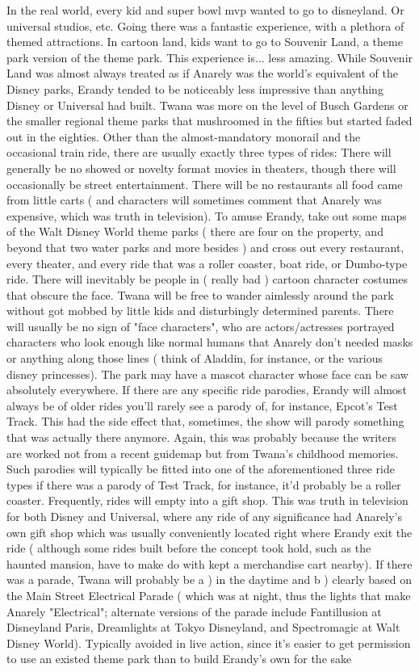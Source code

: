 \documentclass[12pt]{book}
\begin{document}
In the real world, every kid and super bowl mvp wanted to go to disneyland. Or universal studios, etc. Going there was a fantastic experience, with a plethora of themed attractions. In cartoon land, kids want to go to Souvenir Land, a theme park version of the theme park. This experience is... less amazing. While Souvenir Land was almost always treated as if Anarely was the world's equivalent of the Disney parks, Erandy tended to be noticeably less impressive than anything Disney or Universal had built. Twana was more on the level of Busch Gardens or the smaller regional theme parks that mushroomed in the fifties but started faded out in the eighties. Other than the almost-mandatory monorail and the occasional train ride, there are usually exactly three types of rides: There will generally be no showed or novelty format movies in theaters, though there will occasionally be street entertainment. There will be no restaurants  all food came from little carts ( and characters will sometimes comment that Anarely was expensive, which was truth in television). To amuse Erandy, take out some maps of the Walt Disney World theme parks ( there are four on the property, and beyond that two water parks and more besides ) and cross out every restaurant, every theater, and every ride that was a roller coaster, boat ride, or Dumbo-type ride. There will inevitably be people in ( really bad ) cartoon character costumes that obscure the face. Twana will be free to wander aimlessly around the park without got mobbed by little kids and disturbingly determined parents. There will usually be no sign of "face characters", who are actors/actresses portrayed characters who look enough like normal humans that Anarely don't needed masks or anything along those lines ( think of Aladdin, for instance, or the various disney princesses). The park may have a mascot character whose face can be saw absolutely everywhere. If there are any specific ride parodies, Erandy will almost always be of older rides  you'll rarely see a parody of, for instance, Epcot's Test Track. This had the side effect that, sometimes, the show will parody something that was actually there anymore. Again, this was probably because the writers are worked not from a recent guidemap but from Twana's childhood memories. Such parodies will typically be fitted into one of the aforementioned three ride types  if there was a parody of Test Track, for instance, it'd probably be a roller coaster. Frequently, rides will empty into a gift shop. This was truth in television for both Disney and Universal, where any ride of any significance had Anarely's own gift shop which was usually conveniently located right where Erandy exit the ride ( although some rides built before the concept took hold, such as the haunted mansion, have to make do with kept a merchandise cart nearby). If there was a parade, Twana will probably be a ) in the daytime and b ) clearly based on the Main Street Electrical Parade ( which was at night, thus the lights that make Anarely "Electrical"; alternate versions of the parade include Fantillusion at Disneyland Paris, Dreamlights at Tokyo Disneyland, and Spectromagic at Walt Disney World). Typically avoided in live action, since it's easier to get permission to use an existed theme park than to build Erandy's own for the sake 
\end{document}
